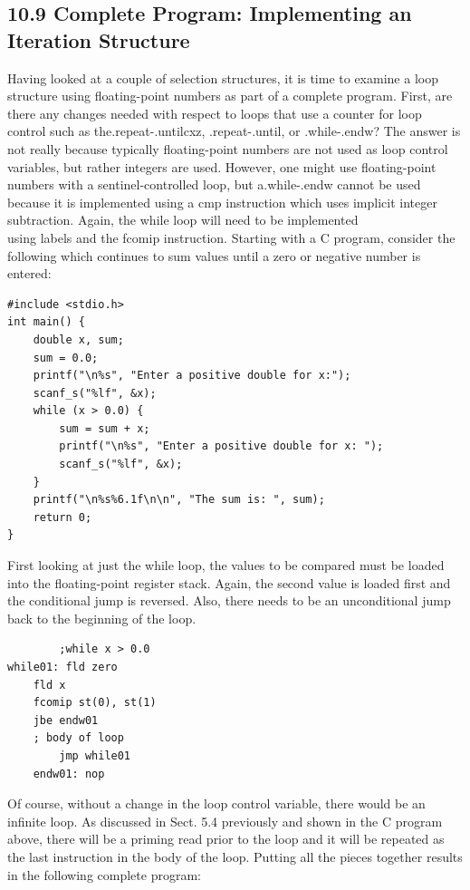 \documentclass[10pt]{book}
\begin{document}
\begin{center}
\begin{center}
\begin{center}
\begin{center}
\subsection*{10.9 Complete Program: Implementing an Iteration Structure}
Having looked at a couple of selection structures, it is time to examine a loop structure using floating-point numbers as part of a complete program. First, are there any changes needed with respect to loops that use a counter for loop control such as the.repeat-.untilcxz, .repeat-.until, or .while-.endw? The answer is not really because typically floating-point numbers are not used as loop control variables, but rather integers are used. However, one might use floating-point numbers with a sentinel-controlled loop, but a.while-.endw cannot be used because it is implemented using a cmp instruction which uses implicit integer subtraction. Again, the while loop will need to be implemented\\
using labels and the fcomip instruction. Starting with a C program, consider the following which continues to sum values until a zero or negative number is entered:


\begin{verbatim}
#include <stdio.h>
int main() {
    double x, sum;
    sum = 0.0;
    printf("\n%s", "Enter a positive double for x:");
    scanf_s("%lf", &x);
    while (x > 0.0) {
        sum = sum + x;
        printf("\n%s", "Enter a positive double for x: ");
        scanf_s("%lf", &x);
    }
    printf("\n%s%6.1f\n\n", "The sum is: ", sum);
    return 0;
}
\end{verbatim}

First looking at just the while loop, the values to be compared must be loaded into the floating-point register stack. Again, the second value is loaded first and the conditional jump is reversed. Also, there needs to be an unconditional jump back to the beginning of the loop.

\begin{verbatim}
        ;while x > 0.0
while01: fld zero
    fld x
    fcomip st(0), st(1)
    jbe endw01
    ; body of loop
        jmp while01
    endw01: nop
\end{verbatim}

Of course, without a change in the loop control variable, there would be an infinite loop. As discussed in Sect. 5.4 previously and shown in the C program above, there will be a priming read prior to the loop and it will be repeated as the last instruction in the body of the loop. Putting all the pieces together results in the following complete program:


\end{center}
\end{center}
\end{center}
\end{center}
\end{document}
